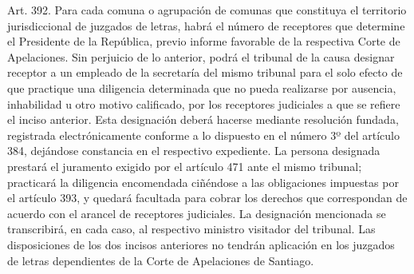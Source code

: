     Art. 392. Para cada comuna o agrupación de comunas que constituya el territorio jurisdiccional de juzgados de letras, habrá el número de receptores que determine el Presidente de la República, previo informe favorable de la respectiva Corte de Apelaciones.
    Sin perjuicio de lo anterior, podrá el tribunal de la causa designar receptor a un empleado de la secretaría del mismo tribunal para el solo efecto de que practique una diligencia determinada que no pueda realizarse por ausencia, inhabilidad u otro motivo calificado, por los receptores judiciales a que se refiere el inciso anterior. Esta designación deberá hacerse mediante resolución fundada, registrada electrónicamente conforme a lo dispuesto en el número 3º del artículo 384, dejándose constancia en el respectivo expediente.
    La persona designada prestará el juramento exigido por el artículo 471 ante el mismo tribunal; practicará la diligencia encomendada ciñéndose a las obligaciones impuestas por el artículo 393, y quedará facultada para cobrar los derechos que correspondan de acuerdo con el arancel de receptores judiciales.
    La designación mencionada se transcribirá, en cada caso, al respectivo ministro visitador del tribunal.
    Las disposiciones de los dos incisos anteriores no tendrán aplicación en los juzgados de letras dependientes de la Corte de Apelaciones de Santiago.



